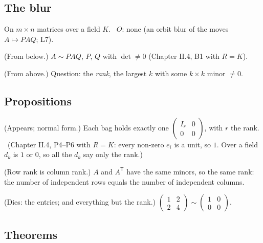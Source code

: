 \subsection*{The blur}

On $m \times n$ matrices over a field $K$. \ $O$: none (an orbit blur of the moves $A \mapsto PAQ$; L7).

\begin{lines}
\item[\lab{B1}] (From below.) $A \sim PAQ$, $P$, $Q$ with $\det \ne 0$ (Chapter II.4, B1 with $R = K$).
\item[\lab{B2}] (From above.) Question: the \emph{rank}, the largest $k$ with some $k \times k$ minor $\ne 0$.
\end{lines}

\subsection*{Propositions}

\begin{lines}
\item[\lab{P1}] (Appears; normal form.) Each bag holds exactly one $\begin{pmatrix} I_r & 0 \\ 0 & 0 \end{pmatrix}$, with $r$ the rank. \ (Chapter II.4, P4--P6 with $R = K$: every non-zero $e_i$ is a unit, so $1$. Over a field $d_k$ is $1$ or $0$, so all the $d_k$ say only the rank.)
\item[\lab{P2}] (Row rank is column rank.) $A$ and $A^{\mathsf T}$ have the same minors, so the same rank: the number of independent rows equals the number of independent columns.
\item[\lab{P3}] (Dies: the entries; and everything but the rank.) $\begin{pmatrix} 1 & 2 \\ 2 & 4 \end{pmatrix} \sim \begin{pmatrix} 1 & 0 \\ 0 & 0 \end{pmatrix}$.
\end{lines}

\subsection*{Theorems}

